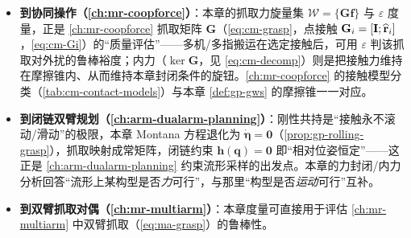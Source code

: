 \begin{itemize}
  \item \textbf{到协同操作（\cref{ch:mr-coopforce}）}：本章的抓取力旋量集 $\mathcal{W}=\{\mathbf{G}\mathbf{f}\}$ 与 $\varepsilon$ 度量，正是 \cref{ch:mr-coopforce} 抓取矩阵 $\mathbf{G}$（\cref{eq:cm-grasp}，点接触 $\mathbf{G}_i=[\mathbf{I};\widehat{\mathbf{r}}_i]$，\cref{eq:cm-Gi}）的“质量评估”——多机/多指搬运在选定接触后，可用 $\varepsilon$ 判该抓取对外扰的鲁棒裕度；内力（$\ker\mathbf{G}$，见 \cref{eq:cm-decomp}）则是把接触力维持在摩擦锥内、从而维持本章封闭条件的旋钮。\cref{ch:mr-coopforce} 的接触模型分类（\cref{tab:cm-contact-models}）与本章 \cref{def:gp-gws} 的摩擦锥一一对应。
  \item \textbf{到闭链双臂规划（\cref{ch:arm-dualarm-planning}）}：刚性共持是“接触永不滚动/滑动”的极限，本章 Montana 方程退化为 $\dot{\boldsymbol{\eta}}=\mathbf{0}$（\cref{prop:gp-rolling-grasp}），抓取映射成常矩阵，闭链约束 $\mathbf{h}(\mathbf{q})=\mathbf{0}$ 即“相对位姿恒定”——这正是 \cref{ch:arm-dualarm-planning} 约束流形采样的出发点。本章的力封闭/内力分析回答“流形上某构型是否\emph{力}可行”，与那里“构型是否\emph{运动}可行”互补。
  \item \textbf{到双臂抓取对偶（\cref{ch:mr-multiarm}）}：本章度量可直接用于评估 \cref{ch:mr-multiarm} 中双臂抓取（\cref{eq:ma-grasp}）的鲁棒性。
\end{itemize}

